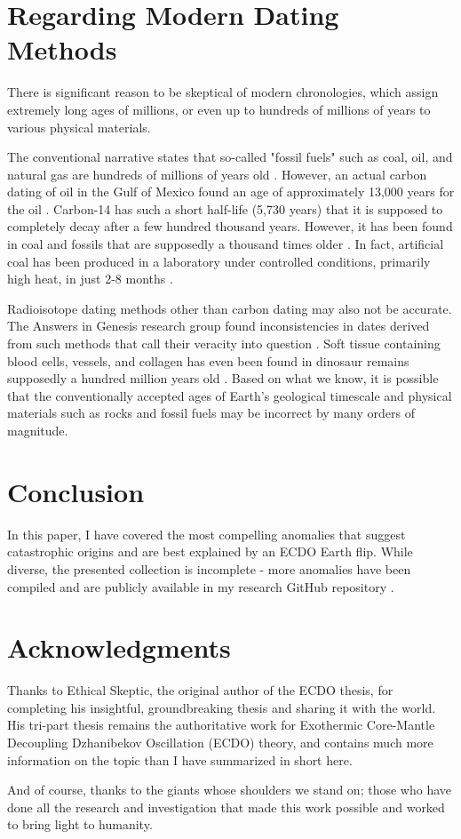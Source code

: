 \documentclass[10pt,twocolumn,letterpaper]{article}
\begin{document}
\section{Regarding Modern Dating Methods}

There is significant reason to be skeptical of modern chronologies, which assign extremely long ages of millions, or even up to hundreds of millions of years to various physical materials.

The conventional narrative states that so-called "fossil fuels" such as coal, oil, and natural gas are hundreds of millions of years old \cite{104}. However, an actual carbon dating of oil in the Gulf of Mexico found an age of approximately 13,000 years for the oil \cite{105}. Carbon-14 has such a short half-life (5,730 years) that it is supposed to completely decay after a few hundred thousand years. However, it has been found in coal and fossils that are supposedly a thousand times older \cite{106}. In fact, artificial coal has been produced in a laboratory under controlled conditions, primarily high heat, in just 2-8 months \cite{107}.

Radioisotope dating methods other than carbon dating may also not be accurate. The Answers in Genesis research group found inconsistencies in dates derived from such methods that call their veracity into question \cite{108}. Soft tissue containing blood cells, vessels, and collagen has even been found in dinosaur remains supposedly a hundred million years old \cite{109,110}. Based on what we know, it is possible that the conventionally accepted ages of Earth's geological timescale and physical materials such as rocks and fossil fuels may be incorrect by many orders of magnitude.

\section{Conclusion}

In this paper, I have covered the most compelling anomalies that suggest catastrophic origins and are best explained by an ECDO Earth flip. While diverse, the presented collection is incomplete - more anomalies have been compiled and are publicly available in my research GitHub repository \cite{2}.

\section{Acknowledgments}

Thanks to Ethical Skeptic, the original author of the ECDO thesis, for completing his insightful, groundbreaking thesis and sharing it with the world. His tri-part thesis \cite{1} remains the authoritative work for Exothermic Core-Mantle Decoupling Dzhanibekov Oscillation (ECDO) theory, and contains much more information on the topic than I have summarized in short here.

And of course, thanks to the giants whose shoulders we stand on; those who have done all the research and investigation that made this work possible and worked to bring light to humanity.

\clearpage
\twocolumn

{\small


}
\end{document}
